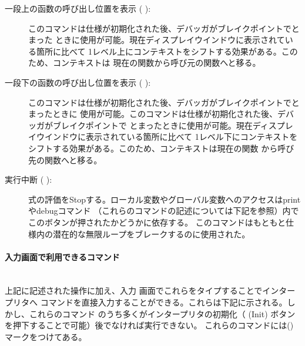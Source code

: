 \documentclass[\pformat,12pt]{jarticle}
\newcommand{\subsubsubsection}[1]{\paragraph{#1}\mbox{}\\}
\newcommand{\guicmd}[1]{{\gt #1}}
\begin{document}
\begin{description}
\item[\guicmd{一段上の函数の呼び出し位置を表示} (\hspace{-1.8mm}
):] 
このコマンドは仕様が初期化された後、デバッガがブレイクポイントでとまった
ときに使用が可能。現在ディスプレイウインドウに表示されている箇所に比べて
1レベル上にコンテキストをシフトする効果がある。このため、コンテキストは
現在の関数から呼び元の関数へと移る。

\item[\guicmd{一段下の函数の呼び出し位置を表示} (\hspace{-1.8mm}
):]
このコマンドは仕様が初期化された後、デバッガがブレイクポイントでとまったときに
使用が可能。このコマンドは仕様が初期化された後、デバッガがブレイクポイントで
とまったときに使用が可能。現在ディスプレイウインドウに表示されている箇所に比べて
1レベル下にコンテキストをシフトする効果がある。このため、コンテキストは現在の関数
から呼び先の関数へと移る。

\item[\guicmd{実行中断} (\hspace{-1.8mm}
):] 
  式の評価をStopする。ローカル変数やグローバル変数へのアクセスは\guicmd{print}や\guicmd{debug}コマンド
  （これらのコマンドの記述については下記を参照）内でこのボタンが押されたかどうかに依存する。
  このコマンドはもともと仕様内の潜在的な無限ループをブレークするのに使用された。
\end{description}

\subsubsubsection{入力画面で利用できるコマンド}


上記に記述された操作に加え、\guicmd{入力} 画面でこれらをタイプすることでインタープリタへ
コマンドを直接入力することができる。これらは下記に示される。しかし、これらのコマンド
のうち多くがインタープリタの初期化（
(\guicmd{Init}) ボタンを押下することで可能）後でなければ実行できない。
これらのコマンドには({\tt *})マークをつけてある。
\end{document}
